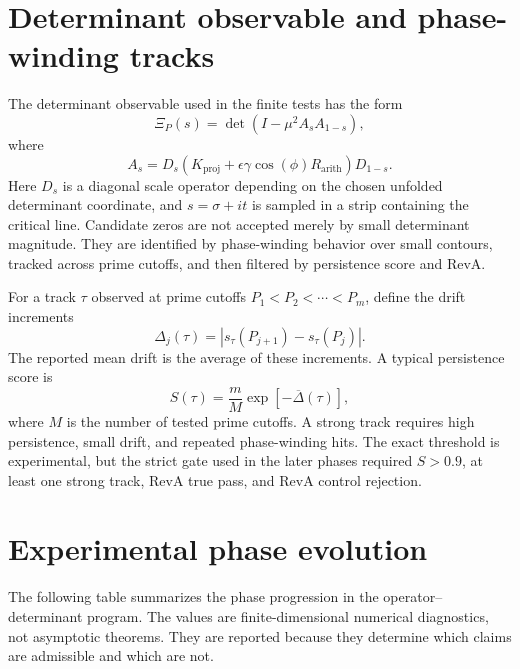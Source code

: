\documentclass[11pt]{article}
\newcommand{\Rarith}{R_{\mathrm{arith}}}
\newcommand{\Kproj}{K_{\mathrm{proj}}}
\theoremstyle{definition}
\theoremstyle{plain}
\begin{document}
\section{Determinant observable and phase-winding tracks}

The determinant observable used in the finite tests has the form
\begin{equation}
  \Xi_{P}(s)=\det\left(I-\mu^2A_sA_{1-s}\right),
\end{equation}
where
\begin{equation}
  A_s=D_s\left(\Kproj+\epsilon\gamma\cos(\phi)\Rarith\right)D_{1-s}.
\end{equation}
Here $D_s$ is a diagonal scale operator depending on the chosen unfolded determinant coordinate, and $s=\sigma+it$ is sampled in a strip containing the critical line.  Candidate zeros are not accepted merely by small determinant magnitude.  They are identified by phase-winding behavior over small contours, tracked across prime cutoffs, and then filtered by persistence score and RevA.

For a track $\tau$ observed at prime cutoffs $P_1<P_2<\cdots<P_m$, define the drift increments
\begin{equation}
  \Delta_j(\tau)=|s_\tau(P_{j+1})-s_\tau(P_j)|.
\end{equation}
The reported mean drift is the average of these increments.  A typical persistence score is
\begin{equation}
  S(\tau)=\frac{m}{M}\exp[-\overline{\Delta}(\tau)],
\end{equation}
where $M$ is the number of tested prime cutoffs.  A strong track requires high persistence, small drift, and repeated phase-winding hits.  The exact threshold is experimental, but the strict gate used in the later phases required $S>0.9$, at least one strong track, RevA true pass, and RevA control rejection.

\section{Experimental phase evolution}

The following table summarizes the phase progression in the operator--determinant program.  The values are finite-dimensional numerical diagnostics, not asymptotic theorems.  They are reported because they determine which claims are admissible and which are not.
\end{document}
